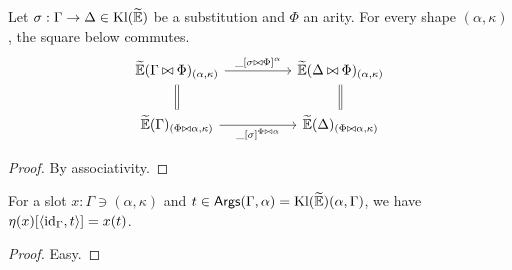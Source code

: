 \begin{lemma}\label{lem:currying}
    Let $\sigma : \Gamma \to \Delta \in \mathrm{Kl}(\widetilde{\mathbb{E}})$ be a substitution and $\Phi$ an arity. For every shape $(\alpha, \kappa)$, the square below commutes.
    \[\begin{tikzcd}
    	{\widetilde{\mathbb{E}}(\Gamma\concat\Phi)_{(\alpha,\kappa)}} && {\widetilde{\mathbb{E}}(\Delta\concat\Phi)_{(\alpha,\kappa)}} \\
    	{\widetilde{\mathbb{E}}(\Gamma)_{(\Phi\concat \alpha,\kappa)}} && {\widetilde{\mathbb{E}}(\Delta)_{(\Phi\concat \alpha,\kappa)}}
    	\arrow["{\_[\sigma\concat\Phi]^{\alpha}}", from=1-1, to=1-3]
    	\arrow[equals, from=1-1, to=2-1]
    	\arrow[equals, from=1-3, to=2-3]
    	\arrow["{\_[\sigma]^{\Phi\concat\alpha}}"', from=2-1, to=2-3]
    \end{tikzcd}\]    
\end{lemma}

\begin{proof}
    By associativity.
\end{proof}

\begin{lemma}\label{lem:instantiation}
    For a slot $x : \Gamma \ni (\alpha, \kappa)$ and $t \in \mathsf{Args}(\Gamma, \alpha) = \mathrm{Kl}(\widetilde{\mathbb{E}})(\alpha, \Gamma)$, we have $\eta(x)[\langle \mathrm{id}_{\Gamma}, t \rangle] = x(t)$.
\end{lemma}

\begin{proof}
    Easy.
\end{proof}

